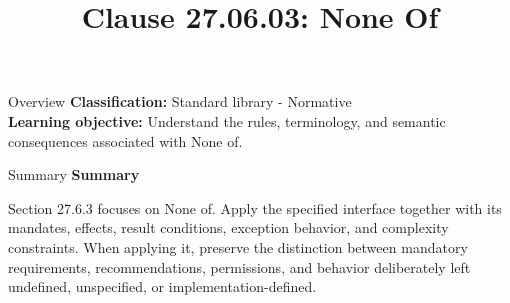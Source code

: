 \documentclass[10pt,letterpaper]{article}
\title{Clause 27.06.03: None Of}
\author{}
\date{}
\begin{document}
\maketitle
\begin{CornellOverviewBox}{Overview}
\textbf{Classification:} Standard library - Normative\\[2pt]
\textbf{Learning objective:} Understand the rules, terminology, and semantic consequences associated with None of.
\end{CornellOverviewBox}\begin{CornellSummaryBox}{Summary}
{\sffamily\bfseries\color{Accent} Summary}\par\vspace{3pt}Section 27.6.3 focuses on None of. Apply the specified interface together with its mandates, effects, result conditions, exception behavior, and complexity constraints. When applying it, preserve the distinction between mandatory requirements, recommendations, permissions, and behavior deliberately left undefined, unspecified, or implementation-defined.
\end{CornellSummaryBox}
\end{document}
